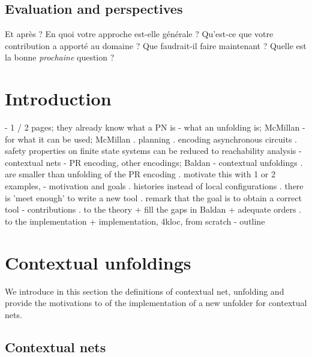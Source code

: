 \documentclass[11pt,a4paper]{article}
\begin{document}
\subsection*{Evaluation and perspectives}

Et après ? En quoi votre approche est-elle générale ? 
Qu'est-ce que votre contribution a apporté au domaine ? 
Que faudrait-il faire maintenant ? 
Quelle est la bonne \emph{prochaine} question ?

\newpage
\section{Introduction}

 - 1 / 2 pages; they already know what a PN is
 - what an unfolding is; McMillan
 - for what it can be used; McMillan
 	. planning
	. encoding asynchronous circuits
	. safety properties on finite state systems can be reduced to
	reachability analysis 
 - contextual nets
 - PR encoding, other encodings; Baldan
 - contextual unfoldings
 	. are smaller than unfolding of the PR encoding
 	. motivate this with 1 or 2 examples,
 - motivation and goals
 	. histories instead of local configurations
	. there is 'meet enough' to write a new tool
	. remark that the goal is to obtain a correct tool
 - contributions
 	. to the theory
		+ fill the gaps in Baldan
		+ adequate orders
 	. to the implementation
		+ implementation, 4kloc, from scratch
 - outline

\section{Contextual unfoldings}

We introduce in this section the definitions of contextual net, unfolding and
provide the motivations to  of the implementation of a new
unfolder for contextual nets.

\subsection{Contextual nets}
\end{document}
